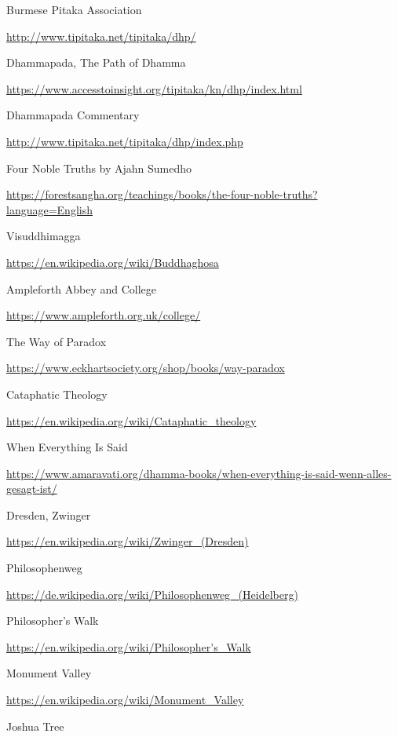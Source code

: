 \begin{thebibliography}{9}
 Burmese Pitaka Association

  {\urlsize \url{http://www.tipitaka.net/tipitaka/dhp/}}

 Dhammapada, The Path of Dhamma

  {\urlsize \url{https://www.accesstoinsight.org/tipitaka/kn/dhp/index.html}}

 Dhammapada Commentary

  {\urlsize \url{http://www.tipitaka.net/tipitaka/dhp/index.php}}

 Four Noble Truths by Ajahn Sumedho

  {\urlsize \url{https://forestsangha.org/teachings/books/the-four-noble-truths?language=English}}

 Visuddhimagga

  {\urlsize \url{https://en.wikipedia.org/wiki/Buddhaghosa}}

 Ampleforth Abbey and College

  {\urlsize \url{https://www.ampleforth.org.uk/college/}}

 The Way of Paradox

  {\urlsize \url{https://www.eckhartsociety.org/shop/books/way-paradox}}

 Cataphatic Theology

  {\urlsize \url{https://en.wikipedia.org/wiki/Cataphatic_theology}}

 When Everything Is Said

  {\urlsize \url{https://www.amaravati.org/dhamma-books/when-everything-is-said-wenn-alles-gesagt-ist/}}

 Dresden, Zwinger

  {\urlsize \url{https://en.wikipedia.org/wiki/Zwinger_(Dresden)}}

 Philosophenweg

  {\urlsize \url{https://de.wikipedia.org/wiki/Philosophenweg_(Heidelberg)}}

 Philosopher's Walk

  {\urlsize \url{https://en.wikipedia.org/wiki/Philosopher's_Walk}}

 Monument Valley

  {\urlsize \url{https://en.wikipedia.org/wiki/Monument_Valley}}

 Joshua Tree


\end{thebibliography}
